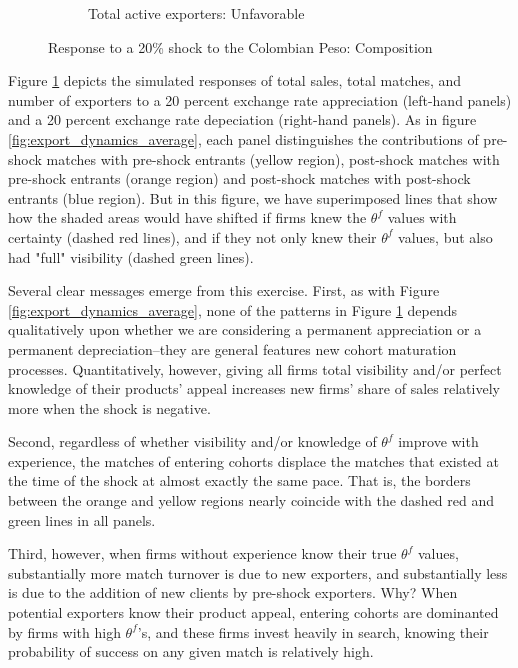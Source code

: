 \documentclass[12pt]{article}
\begin{document}
\begin{figure}[tbp]
\begin{subfigure}[b]{0.45\textwidth}
        \caption{Total active exporters: Unfavorable}
    \end{subfigure}
\caption{Response to a 20\% shock to the Colombian Peso: Composition}
\label{fig:export_dynamics_average_alt}
\end{figure}

Figure \ref{fig:export_dynamics_average_alt} depicts the simulated responses of total sales, total matches, and number of exporters to a 20 percent exchange rate appreciation (left-hand panels) and a 20 percent exchange rate depeciation (right-hand panels). As in figure \ref{fig:export_dynamics_average}, each panel distinguishes the contributions of pre-shock matches with pre-shock entrants (yellow region), post-shock matches with pre-shock entrants (orange region) and post-shock matches with post-shock entrants (blue region). But in this figure, we have superimposed lines that show how the shaded areas would have shifted if firms knew the $\theta ^{f}$ values with certainty (dashed red lines), and if they not only knew their $\theta ^{f}$ values, but also had "full" visibility (dashed green lines).


Several clear messages emerge from this exercise. First, as with Figure \ref{fig:export_dynamics_average}, none of the patterns in Figure \ref{fig:export_dynamics_average_alt} depends qualitatively upon whether we are considering a permanent appreciation or a permanent depreciation--they are general features new cohort maturation processes. Quantitatively, however, giving all firms total visibility and/or perfect knowledge of their products' appeal increases new firms' share of sales relatively more when the shock is negative.

Second, regardless of whether visibility and/or knowledge of $\theta^{f}$ improve with experience, the matches of entering cohorts displace the matches that existed at the time of the shock at almost exactly the same pace. That is, the borders between the orange and yellow regions nearly coincide with the dashed red and green lines in all panels. 

Third, however, when firms without experience know their true $\theta^{f}$ values, substantially more match turnover is due to new exporters, and substantially less is due to the addition of new clients by pre-shock exporters.  Why? When potential exporters know their product appeal, entering cohorts are dominanted by firms with high $\theta^{f}$'s, and these firms invest heavily in search, knowing their probability of success on any given match is relatively high. 
\end{document}
